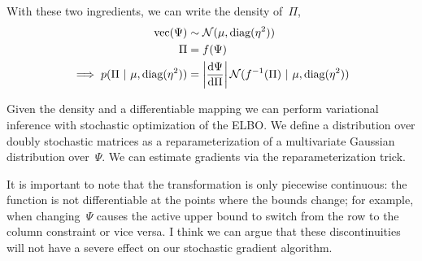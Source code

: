 \documentclass{article}
\begin{document}
With these two ingredients, we can write the density of~${\Pi}$,
\begin{align}
  \text{vec} (\Psi) &\sim \mathcal{N}(\mu, \textrm{diag}(\eta^2))
  \\
  {\Pi} &= f(\Psi) \\
  \implies
  p(\Pi ~\vert~ \mu, \textrm{diag}(\eta^2)) &= \left|\frac{\mathrm{d} \Psi }{\mathrm{d} {\Pi}} \right|
  \mathcal{N}(f^{-1}({\Pi}) ~\vert~ \mu, \textrm{diag}(\eta^2))
\end{align}

Given the density and a differentiable mapping we can perform
variational inference with stochastic optimization of the ELBO.
We define a distribution over doubly stochastic matrices as a
reparameterization of a multivariate Gaussian distribution
over~$\Psi$. We can estimate gradients via the reparameterization
trick.

It is important to note that the transformation is only piecewise
continuous: the function is not differentiable at the points where
the bounds change; for example, when changing~$\Psi$ causes the
active upper bound to switch from the row to the column constraint
or vice versa.  I think we can argue that these discontinuities
will not have a severe effect on our stochastic gradient algorithm.
\end{document}

